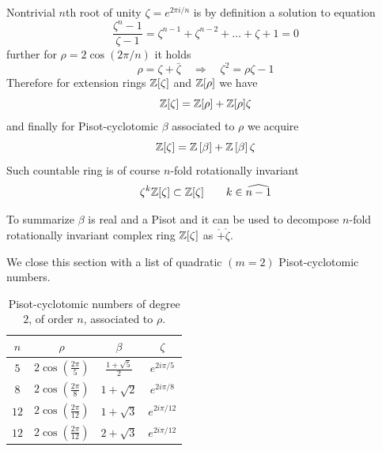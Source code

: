 \documentclass[text.tex]{subfiles}
\begin{document}
Nontrivial $n$th root of unity $\zeta = e^{2\pi i/n}$ is by definition a solution to equation
$$\frac{\zeta^n-1}{\zeta-1} = \zeta^{n-1}+\zeta^{n-2}+\dots+\zeta+1 = 0$$
further for $\rho = 2\cos\left(2\pi/n\right)$ it holds
$$\rho = \zeta + \bar{\zeta}\quad\Rightarrow\quad \zeta^2 = \rho\zeta - 1$$
Therefore for extension rings $\mathbb{Z}[\zeta]$ and $\mathbb{Z}[\rho]$ we have
$$\mathbb{Z}[\zeta] = \mathbb{Z}[\rho] + \mathbb{Z}[\rho]\zeta$$
and finally for Pisot-cyclotomic $\beta$ associated to $\rho$ we acquire
$$\mathbb{Z}[\zeta] = \mathbb{Z}\left[\beta\right] + \mathbb{Z}\left[\beta\right]\zeta$$
Such countable ring is of course $n$-fold rotationally invariant
$$\zeta^k\mathbb{Z}[\zeta] \subset \mathbb{Z}[\zeta]\qquad k\in\widehat{n-1}$$

To summarize $\beta$ is real and a Pisot and it can be used to decompose $n$-fold rotationally invariant complex ring $\mathbb{Z}[\zeta]$ as $\ring + \ring\zeta$. 




We close this section with a list of quadratic $(m=2)$ Pisot-cyclotomic numbers. 

\begin{table}[h!]
\centering
\begin{tabular}{cccc}
$n$ & $\rho$ & $\beta$ & $\zeta$ \\
\hline
$5$   & $2 \cos\left(\frac{2\pi}{5}\right)$   & $\frac{1+\sqrt{5}}{2} $    & $e^{2i\pi/5}$ \\
$8$   & $2 \cos\left(\frac{2\pi}{8}\right)$   & $ 1+\sqrt{2} $      & $e^{2i\pi/8}$ \\
$12$  & $2 \cos\left(\frac{2\pi}{12}\right)$  & $ 1+\sqrt{3} $     & $e^{2i\pi/12}$ \\
$12$  & $2 \cos\left(\frac{2\pi}{12}\right)$  & $ 2+\sqrt{3} $                & $e^{2i\pi/12}$ \\
\end{tabular}
\caption{Pisot-cyclotomic numbers of degree $2$, of order $n$, associated to $\rho$.}
\label{tab_quadraticPisotCyclotomic}
\end{table}
\end{document}
